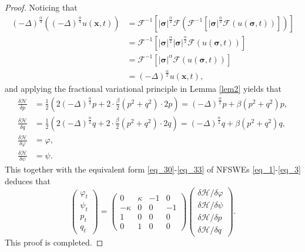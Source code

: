 \documentclass[preprint,compress,3p,10pt,fleqn]{elsarticle}
\numberwithin{equation}{section}
\begin{document}
\begin{proof}
Noticing that
\begin{align}\label{eq_12071}
(-\Delta)^{\frac{\alpha}{4}}((-\Delta)^{\frac{\alpha}{4}}  u(\boldsymbol{x},t))&=\mathcal{F}^{-1}\left[|\boldsymbol{\sigma}|^{\frac{\alpha}{2}} \mathcal{F}(\mathcal{F}^{-1}\left[|\boldsymbol{\sigma}|^{\frac{\alpha}{2}} \mathcal{F}(u(\boldsymbol{\sigma},t))\right])\right]\nonumber\\
&=\mathcal{F}^{-1}\left[|\boldsymbol{\sigma}|^{\frac{\alpha}{2}} |\boldsymbol{\sigma}|^{\frac{\alpha}{2}} \mathcal{F}(u(\boldsymbol{\sigma},t))\right]\nonumber\\
&=\mathcal{F}^{-1}\left[|\boldsymbol{\sigma}|^{\alpha} \mathcal{F}(u(\boldsymbol{\sigma},t))\right]\nonumber\\
&=(-\Delta)^{\frac{\alpha}{2}} u(\boldsymbol{x},t),
\end{align}
and applying the fractional variational principle in Lemma \ref{lem2} yields that
\begin{align}
\frac{\delta \mathcal{H}}{\delta p} &=\frac{1}{2}\left(2(-\Delta)^{\frac{\alpha}{2}} p+2 \cdot \frac{\beta}{2}\left(p^{2}+q^{2}\right) \cdot 2 p\right)=(-\Delta)^{\frac{\alpha}{2}}p+\beta\left(p^{2}+q^{2}\right) p,\label{eq_38a}\\
\frac{\delta \mathcal{H}}{\delta q} &=\frac{1}{2}\left(2(-\Delta)^{\frac{\alpha}{2}} q+2 \cdot \frac{\beta}{2}\left(p^{2}+q^{2}\right) \cdot 2 q\right)=(-\Delta)^{\frac{\alpha}{2}}q+\beta\left(p^{2}+q^{2}\right) q,\label{eq_38b}\\
\frac{\delta \mathcal{H}}{\delta \varphi} &=\varphi,\label{eq_38c}\\
\frac{\delta \mathcal{H}}{\delta \psi} &=\psi.\label{eq_38}
\end{align}
This together with the
equivalent form \eqref{eq_30}-\eqref{eq_33} of NFSWEs \eqref{eq_1}-\eqref{eq_3} deduces that
\begin{equation}\label{eq_39}
\left(\begin{array}{l}
		\varphi_{t} \\
		\psi_{t} \\
		p_{t} \\
		q_{t}
\end{array}\right)
=\left(\begin{array}{cccc}
			0 & \kappa & -1 & 0 \\
			-\kappa & 0 & 0 & -1 \\
			1 & 0 & 0 & 0 \\
			0 & 1 & 0 & 0
\end{array}\right)
\left(\begin{array}{l}
		\delta \mathcal{H} / \delta \varphi \\
		\delta \mathcal{H} / \delta \psi \\
		\delta \mathcal{H} / \delta p \\
		\delta \mathcal{H} / \delta q
\end{array}\right).
\end{equation}
This proof is completed.
\end{proof}
\end{document}
